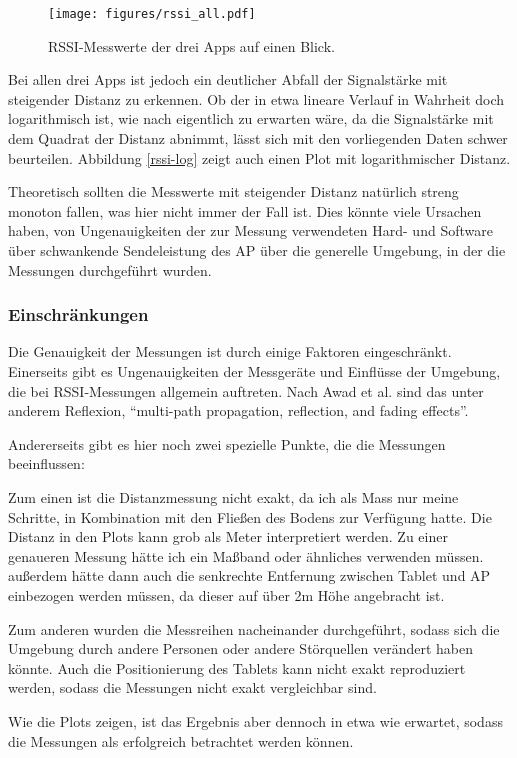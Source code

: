 \begin{figure}[h]
    \centering
    \texttt{[image: figures/rssi\_all.pdf]}
    \caption{RSSI-Messwerte der drei Apps auf einen Blick.}
    \label{rssi}
\end{figure}


Bei allen drei Apps ist jedoch ein deutlicher Abfall der Signalstärke mit steigender Distanz zu erkennen.
Ob der in etwa lineare Verlauf in Wahrheit doch logarithmisch ist, wie nach \cite{reliable} eigentlich zu erwarten wäre, da die Signalstärke mit dem Quadrat der Distanz abnimmt, lässt sich mit den vorliegenden Daten schwer beurteilen. Abbildung \ref{rssi-log} zeigt auch einen Plot mit logarithmischer Distanz.

Theoretisch sollten die Messwerte mit steigender Distanz natürlich streng monoton fallen, was hier nicht immer der Fall ist.
Dies könnte viele Ursachen haben, von Ungenauigkeiten der zur Messung verwendeten Hard- und Software über schwankende Sendeleistung des AP über die generelle Umgebung, in der die Messungen durchgeführt wurden.

\subsubsection*{Einschränkungen}
Die Genauigkeit der Messungen ist durch einige Faktoren eingeschränkt. Einerseits gibt es Ungenauigkeiten der Messgeräte und Einflüsse der Umgebung, die bei RSSI-Messungen allgemein auftreten. Nach Awad et al. sind das unter anderem Reflexion, \enquote{multi-path propagation, reflection, and fading effects}\cite{adaptive}.

Andererseits gibt es hier noch zwei spezielle Punkte, die die Messungen beeinflussen:

Zum einen ist die Distanzmessung nicht exakt, da ich als Mass nur meine Schritte, in Kombination mit den Fließen des Bodens zur Verfügung hatte. Die Distanz in den Plots kann grob als Meter interpretiert werden. Zu einer genaueren Messung hätte ich ein Maßband oder ähnliches verwenden müssen. außerdem hätte dann auch die senkrechte Entfernung zwischen Tablet und AP einbezogen werden müssen, da dieser auf über 2m Höhe angebracht ist.

Zum anderen wurden die Messreihen nacheinander durchgeführt, sodass sich die Umgebung durch andere Personen oder andere Störquellen verändert haben könnte. Auch die Positionierung des Tablets kann nicht exakt reproduziert werden, sodass die Messungen nicht exakt vergleichbar sind.

Wie die Plots zeigen, ist das Ergebnis aber dennoch in etwa wie erwartet, sodass die Messungen als erfolgreich betrachtet werden können.


